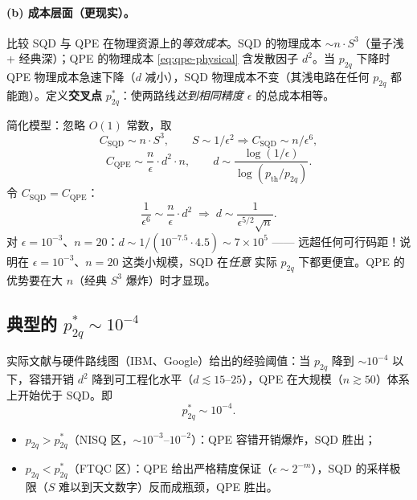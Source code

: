 \documentclass[11pt]{article}
\newcommand{\eps}{\epsilon}
\newcommand{\Oof}[1]{O(#1)}
\begin{document}
\paragraph{(b) 成本层面（更现实）。} 比较 SQD 与 QPE 在物理资源上的\emph{等效成本}。SQD 的物理成本 $\sim n\cdot S^3$（量子浅 + 经典深）；QPE 的物理成本 \eqref{eq:qpe-physical} 含发散因子 $d^2$。当 $p_{2q}$ 下降时 QPE 物理成本急速下降（$d$ 减小），SQD 物理成本不变（其浅电路在任何 $p_{2q}$ 都能跑）。定义\textbf{交叉点} $p_{2q}^\ast$：使两路线\emph{达到相同精度 $\eps$} 的总成本相等。

简化模型：忽略 $\Oof{1}$ 常数，取
\begin{equation}
  C_{\mathrm{SQD}} \sim n\cdot S^3,\qquad S\sim 1/\eps^2 \Rightarrow C_{\mathrm{SQD}}\sim n/\eps^6,
\end{equation}
\begin{equation}
  C_{\mathrm{QPE}} \sim \frac{n}{\eps}\cdot d^2\cdot n,\qquad d\sim \frac{\log(1/\eps)}{\log(p_{\mathrm{th}}/p_{2q})}.
\end{equation}
令 $C_{\mathrm{SQD}}=C_{\mathrm{QPE}}$：
\begin{equation}
  \frac{1}{\eps^6} \sim \frac{n}{\eps}\cdot d^2
  \;\Longrightarrow\;
  d \sim \frac{1}{\eps^{5/2}\sqrt n}.
\end{equation}
对 $\eps=10^{-3}$、$n=20$：$d\sim 1/(10^{-7.5}\cdot 4.5)\sim 7\times 10^5$ —— 远超任何可行码距！说明在 $\eps=10^{-3}$、$n=20$ 这类小规模，SQD 在\emph{任意} 实际 $p_{2q}$ 下都更便宜。QPE 的优势要在大 $n$（经典 $S^3$ 爆炸）时才显现。

\subsection{典型的 $p_{2q}^\ast\sim 10^{-4}$}
实际文献与硬件路线图（IBM、Google）给出的经验阈值：当 $p_{2q}$ 降到 $\sim 10^{-4}$ 以下，容错开销 $d^2$ 降到可工程化水平（$d\lesssim 15$--$25$），QPE 在大规模（$n\gtrsim 50$）体系上开始优于 SQD。即
\begin{equation}
  \boxed{p_{2q}^\ast \sim 10^{-4}.}
\end{equation}
\begin{itemize}
  \item $p_{2q}>p_{2q}^\ast$（NISQ 区，$\sim 10^{-3}$--$10^{-2}$）：QPE 容错开销爆炸，SQD 胜出；
  \item $p_{2q}<p_{2q}^\ast$（FTQC 区）：QPE 给出严格精度保证（$\eps\sim 2^{-m}$），SQD 的采样极限（$S$ 难以到天文数字）反而成瓶颈，QPE 胜出。
\end{itemize}
\end{document}
